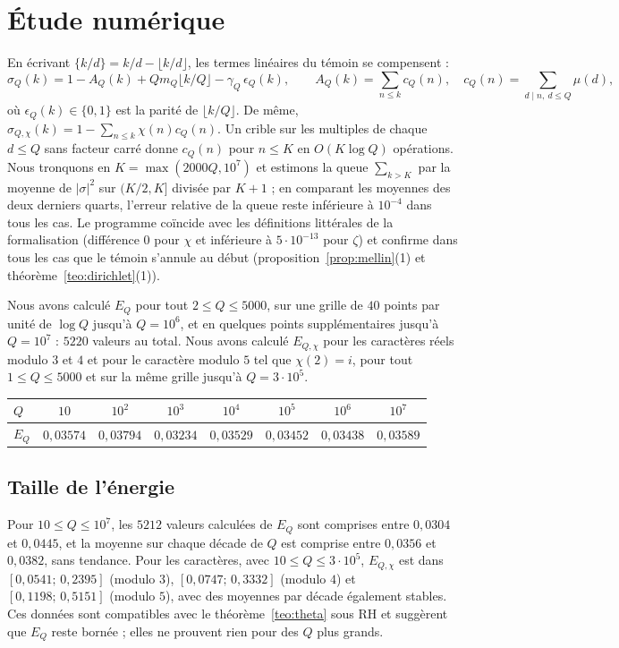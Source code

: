 \documentclass[11pt,a4paper]{amsart}
\theoremstyle{definition}
\theoremstyle{remark}
\begin{document}
\section{\'Etude num\'erique}\label{sec:numerica}

En \'ecrivant $\{k/d\}=k/d-\lfloor k/d\rfloor$, les termes lin\'eaires du t\'emoin se compensent :
\[
\sigma_Q(k)=1-A_Q(k)+Qm_Q\lfloor k/Q\rfloor-\gamma_Q\,\epsilon_Q(k),\qquad
A_Q(k)=\sum_{n\le k}c_Q(n),\quad c_Q(n)=\sum_{d\mid n,\ d\le Q}\mu(d),
\]
o\`u $\epsilon_Q(k)\in\{0,1\}$ est la parit\'e de $\lfloor k/Q\rfloor$. De m\^eme, $\sigma_{Q,\chi}(k)=1-\sum_{n\le k}\chi(n)c_Q(n)$. Un crible sur les multiples de chaque $d\le Q$ sans facteur carr\'e donne $c_Q(n)$ pour $n\le K$ en $O(K\log Q)$ op\'erations. Nous tronquons en $K=\max(2000Q,10^7)$ et estimons la queue $\sum_{k>K}$ par la moyenne de $|\sigma|^2$ sur $(K/2,K]$ divis\'ee par $K+1$ ; en comparant les moyennes des deux derniers quarts, l'erreur relative de la queue reste inf\'erieure \`a $10^{-4}$ dans tous les cas. Le programme co\"incide avec les d\'efinitions litt\'erales de la formalisation (diff\'erence $0$ pour $\chi$ et inf\'erieure \`a $5\cdot10^{-13}$ pour $\zeta$) et confirme dans tous les cas que le t\'emoin s'annule au d\'ebut (proposition~\ref{prop:mellin}(1) et th\'eor\`eme~\ref{teo:dirichlet}(1)).

Nous avons calcul\'e $E_Q$ pour tout $2\le Q\le5000$, sur une grille de $40$ points par unit\'e de $\log Q$ jusqu'\`a $Q=10^6$, et en quelques points suppl\'ementaires jusqu'\`a $Q=10^7$ : $5220$ valeurs au total. Nous avons calcul\'e $E_{Q,\chi}$ pour les caract\`eres r\'eels modulo $3$ et $4$ et pour le caract\`ere modulo $5$ tel que $\chi(2)=i$, pour tout $1\le Q\le5000$ et sur la m\^eme grille jusqu'\`a $Q=3\cdot10^5$.

\begin{center}
\begin{tabular}{lccccccc}
\toprule
$Q$ & $10$ & $10^2$ & $10^3$ & $10^4$ & $10^5$ & $10^6$ & $10^7$\\
\midrule
$E_Q$ & $0{,}03574$ & $0{,}03794$ & $0{,}03234$ & $0{,}03529$ & $0{,}03452$ & $0{,}03438$ & $0{,}03589$\\
\bottomrule
\end{tabular}
\end{center}

\subsection*{Taille de l'\'energie}
Pour $10\le Q\le10^7$, les $5212$ valeurs calcul\'ees de $E_Q$ sont comprises entre $0{,}0304$ et $0{,}0445$, et la moyenne sur chaque d\'ecade de $Q$ est comprise entre $0{,}0356$ et $0{,}0382$, sans tendance. Pour les caract\`eres, avec $10\le Q\le3\cdot10^5$, $E_{Q,\chi}$ est dans $[0{,}0541;\,0{,}2395]$ (modulo $3$), $[0{,}0747;\,0{,}3332]$ (modulo $4$) et $[0{,}1198;\,0{,}5151]$ (modulo $5$), avec des moyennes par d\'ecade \'egalement stables. Ces donn\'ees sont compatibles avec le th\'eor\`eme~\ref{teo:theta} sous RH et sugg\`erent que $E_Q$ reste born\'ee ; elles ne prouvent rien pour des $Q$ plus grands.
\end{document}
